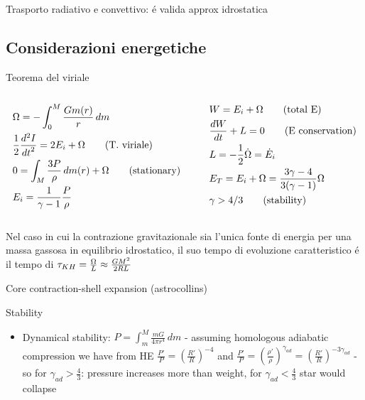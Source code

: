 \begin{frame}{Trasporto radiativo e convettivo: \'e valida approx idrostatica}

\end{frame}

\subsection{Considerazioni energetiche}

\begin{frame}{Teorema del viriale}
\begin{columns}[T]
	\begin{column}{0.45\textwidth}
		\begin{align*}
&\Omega=-\int_0^M\frac{Gm(r)}{r}\,dm\\
&\frac{1}{2}\TtwoDy{t}{I}=2E_i+\Omega\tag{T. viriale}\\
&0=\int_M\frac{3P}{\rho}\,dm(r)+\Omega\tag{stationary}\\
&E_i=\frac{1}{\gamma-1}\frac{P}{\rho}
		\end{align*}
	\end{column}\begin{column}{0.55\textwidth}
		\begin{align*}
&W=E_i+\Omega \tag{total E}\\
&\TDy{t}{W}+L=0\tag{E conservation}\\
&L=-\frac{1}{2}\dot{\Omega}=\dot{E}_i\\
&E_T=E_i+\Omega=\frac{3\gamma-4}{3(\gamma-1)}\Omega\\
&\gamma>4/3\tag{stability}
		\end{align*}
	\end{column}
\end{columns}
Nel caso in cui la contrazione gravitazionale sia l'unica fonte di energia per una massa gassosa in equilibrio idrostatico, il suo tempo di evoluzione caratteristico \'e il tempo di \kh{} $\tkh{}=\frac{\Omega}{L}\approx\frac{GM^2}{2RL}$
\end{frame}

\begin{frame}{Core contraction-shell expansion (astrocollins)}

\end{frame}

\frameinlbftrue
\begin{frame}{Stability}

	\begin{itemize}
		\item 
			Dynamical stability: $P=\int_m^M\frac{mG}{4\pi r^4}\,dm$ - assuming homologous adiabatic compression we have from HE $\frac{P'}{P}=(\frac{R'}{R})^{-4}$ and $\frac{P'}{P}=(\frac{\rho'}{\rho})^{\gamma_{ad}}=(\frac{R'}{R})^{-3\gamma_{ad}}$ - so for $\gamma_{ad}>\frac{4}{3}$: pressure increases more than weight, for $\gamma_{ad}<\frac{4}{3}$ star would collapse
		\end{itemize}
	
\end{frame}
\frameinlbffalse

